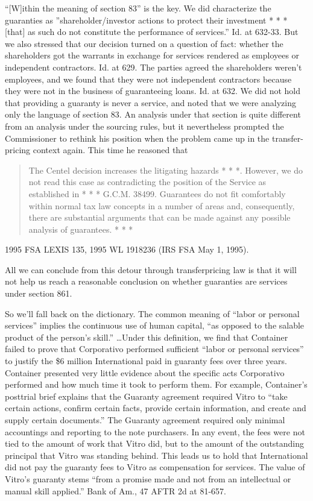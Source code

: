 \begin{select}
``[W]ithin the meaning of section 83'' is the key. We did characterize the guaranties as ''shareholder/investor actions to protect their investment * * * [that] as such do not constitute the performance of services.'' Id. at 632-33. But we  also stressed that our decision turned on a question of fact: whether the shareholders got the warrants in exchange for services rendered as employees or independent contractors. Id. at 629. The parties agreed the shareholders weren't employees, and we found that they were not independent contractors because they were not in the business of guaranteeing loans. Id. at 632. We did not hold that providing a guaranty is never a service, and noted that we were analyzing only the language of section 83. An analysis under that section is quite different from an analysis under the sourcing rules, but it nevertheless prompted the Commissioner to rethink his position when the problem came up in the transfer-pricing context again. This time he reasoned that

\begin{quote}
The Centel decision increases the litigating hazards * * *. However, we do not read this case as contradicting the position of the Service as established in * * * G.C.M. 38499. Guarantees do not fit comfortably within normal tax law concepts in a number of areas and, consequently, there are substantial arguments that can be made against any possible analysis of guarantees. * * *
\end{quote}
1995 FSA LEXIS 135, 1995 WL 1918236 (IRS FSA May 1, 1995).

All we can conclude from this detour through transferpricing law is that it will not help us reach a reasonable conclusion on whether guaranties are services under section 861.

So we'll fall back on the dictionary. The common meaning of ``labor or personal services'' implies the continuous use of human capital, ``as opposed to the salable product of the person's skill.'' \ldots Under this definition, we find that Container failed to prove that Corporativo performed sufficient ``labor or personal services'' to justify the \$6 million International paid in guaranty fees over three years. Container presented very little evidence about the specific acts Corporativo performed and how much time it took to perform them. For example, Container's posttrial brief explains that the Guaranty agreement required Vitro to ``take certain actions, confirm certain facts, provide certain information, and create and supply certain documents.'' The Guaranty agreement required only minimal accountings and reporting to the note purchasers. In any event, the fees were not tied to the amount of work that Vitro did, but to the amount of the outstanding principal that Vitro was standing behind. This leads us to hold that International did not pay the guaranty fees to Vitro as compensation for services. The value of Vitro's guaranty stems ``from a promise made and not from an intellectual or manual skill applied.'' Bank of Am., 47 AFTR 2d at 81-657.



\end{select}
